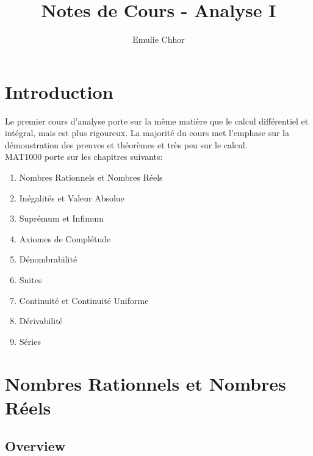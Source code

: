 \documentclass{article}
\begin{document}
\title{Notes de Cours - Analyse I}
\author{Emulie Chhor}
\maketitle

\section*{Introduction}

Le premier cours d'analyse porte sur la même matière que le calcul différentiel
et intégral, mais est plus rigoureux. La majorité du cours met l'emphase sur la
démonstration des preuves et théorèmes et très peu sur le calcul.\\

MAT1000 porte sur les chapitres suivants:

\begin{enumerate}
    \item Nombres Rationnels et Nombres Réels
    \item Inégalités et Valeur Absolue
    \item Suprémum et Infimum
    \item Axiomes de Complétude
    \item Dénombrabilité
    \item Suites
    \item Continuité et Continuité Uniforme
    \item Dérivabilité
    \item Séries
\end{enumerate}

\newtheorem{definition}{Définition}[subsection]
\newtheorem{theorem}{Théorème}[subsection]
\newtheorem{corollary}{Corollaire}[subsection]
\newtheorem{lemma}[theorem]{Lemme}
\newtheorem{proposition}{Proposition}[section]
\newtheorem{axiom}{Axiome}
\newtheorem{property}{Propriété}[subsection]
\newtheorem*{remark}{Remarque}
\newtheorem*{problem}{Problème}
\newtheorem*{intuition}{Intuition}

\newcommand{\euler}{e}
\pagebreak

\section{Nombres Rationnels et Nombres Réels}

\subsection{Overview}
\end{document}
